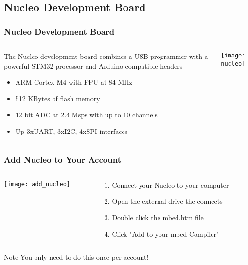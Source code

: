 \subsection{Nucleo Development Board}
\label{sub:nucleo}
\begin{frame}
	\frametitle{Nucleo Development Board}
	\begin{columns}[T]
		\begin{column}{0.5\textwidth}
			The Nucleo development board combines a USB programmer with a powerful STM32 processor and Arduino compatible headers
			\begin{itemize}
				\item ARM Cortex-M4 with FPU at 84 MHz
				\item 512 KBytes of flash memory
				\item 12 bit ADC at 2.4 Msps with up to 10 channels
				\item Up 3xUART, 3xI2C, 4xSPI interfaces
			\end{itemize}
		\end{column}
		\begin{column}{0.5\textwidth}
			\texttt{[image: nucleo]}
		\end{column}
	\end{columns}
\end{frame}

\begin{frame}
	\frametitle{Add Nucleo to Your Account}
	\begin{columns}[c]
		\begin{column}{0.5\textwidth}
			\texttt{[image: add\_nucleo]}
		\end{column}
		\begin{column}{0.5\textwidth}
			\begin{enumerate}
				\item Connect your Nucleo to your computer
				\item Open the external drive the connects
				\item Double click the mbed.htm file
				\item Click "Add to your mbed Compiler"
			\end{enumerate}
		\end{column}
	\end{columns}
	\begin{block}{Note}
		You only need to do this once per account!
	\end{block}
\end{frame}


